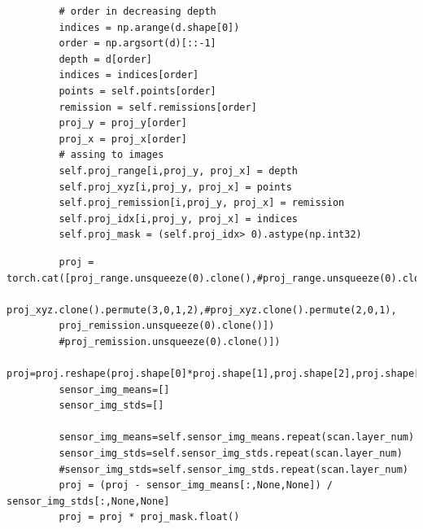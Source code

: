 \documentclass{article}
\begin{document}
\begin{normalsize}
\begin{lstlisting}
         # order in decreasing depth
         indices = np.arange(d.shape[0])
         order = np.argsort(d)[::-1]
         depth = d[order]
         indices = indices[order]
         points = self.points[order]
         remission = self.remissions[order]
         proj_y = proj_y[order]
         proj_x = proj_x[order]
         # assing to images
         self.proj_range[i,proj_y, proj_x] = depth
         self.proj_xyz[i,proj_y, proj_x] = points
         self.proj_remission[i,proj_y, proj_x] = remission
         self.proj_idx[i,proj_y, proj_x] = indices
         self.proj_mask = (self.proj_idx> 0).astype(np.int32)
         \end{lstlisting}
         \begin{lstlisting}
         proj = torch.cat([proj_range.unsqueeze(0).clone(),#proj_range.unsqueeze(0).clone(),
         proj_xyz.clone().permute(3,0,1,2),#proj_xyz.clone().permute(2,0,1),
         proj_remission.unsqueeze(0).clone()])
         #proj_remission.unsqueeze(0).clone()])
         proj=proj.reshape(proj.shape[0]*proj.shape[1],proj.shape[2],proj.shape[3])
         sensor_img_means=[]
         sensor_img_stds=[]
         
         sensor_img_means=self.sensor_img_means.repeat(scan.layer_num)
         sensor_img_stds=self.sensor_img_stds.repeat(scan.layer_num)
         #sensor_img_stds=self.sensor_img_stds.repeat(scan.layer_num)
         proj = (proj - sensor_img_means[:,None,None]) / sensor_img_stds[:,None,None]
         proj = proj * proj_mask.float()
         \end{lstlisting}
         

\end{normalsize}
\end{document}
